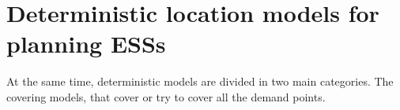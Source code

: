 \section{Deterministic location models for planning ESSs}
At the same time,
deterministic models
are divided in two main categories.
The covering models,
that cover or try to cover
all the demand points.




